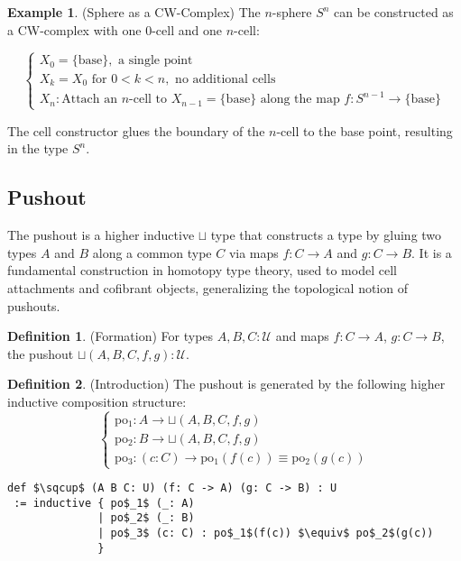 \documentclass{article}
\theoremstyle{definition}
\newtheorem{definition}{Definition}
\newtheorem{example}{Example}
\begin{document}
\begin{example} (Sphere as a CW-Complex)
The $n$-sphere $S^n$ can be constructed as a CW-complex with
one 0-cell and one $n$-cell:

\[
\begin{cases}
X_0 = \{ \text{base} \}, \text{ a single point} \\
X_k = X_0 \text{ for } 0 < k < n, \text{ no additional cells} \\
X_n: \text{Attach an } n\text{-cell to } X_{n-1} = \{ \text{base} \} \text{ along the map } f : S^{n-1} \to \{ \text{base} \}
\end{cases}
\]

The $\text{cell}$ constructor glues the boundary of the $n$-cell
to the base point, resulting in the type $S^n$.
\end{example}

\newpage
\subsection{Pushout}
The pushout is a higher inductive $\sqcup$ type that constructs a type by
gluing two types $A$ and $B$ along a common type $C$ via maps $f : C \to A$
and $g : C \to B$. It is a fundamental construction in homotopy type theory,
used to model cell attachments and cofibrant objects, generalizing the
topological notion of pushouts.

\begin{definition} (Formation)
For types $A, B, C : \mathcal{U}$ and maps $f : C \to A$, $g : C \to B$,
the pushout $\sqcup(A,B,C,f,g) : \mathcal{U}$.
\end{definition}

\begin{definition} (Introduction)
The pushout is generated by the following higher inductive composition structure:
\[
\begin{cases}
\text{po$_1$} : A \to \sqcup(A,B,C,f,g) \\
\text{po$_2$} : B \to \sqcup(A,B,C,f,g) \\
\text{po$_3$} : (c : C) \to \text{po$_1$}(f(c)) \equiv \text{po$_2$}(g(c))
\end{cases}
\]
\begin{lstlisting}[mathescape=true]
def $\sqcup$ (A B C: U) (f: C -> A) (g: C -> B) : U
 := inductive { po$_1$ (_: A)
              | po$_2$ (_: B)
              | po$_3$ (c: C) : po$_1$(f(c)) $\equiv$ po$_2$(g(c))
              }
\end{lstlisting}
\end{definition}
\end{document}
